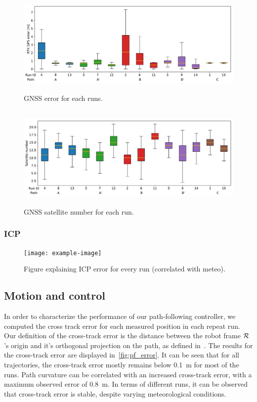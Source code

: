 \begin{figure} [htpb]
	\centering
	\includegraphics[height=2.0in]{./figs/GPS/RTK_error.pdf}
	\caption{GNSS error for each runs.}
	\label{fig:gnss_run_error}
\end{figure}

\begin{figure} [htpb]
	\centering
	\includegraphics[height=2.0in]{./figs/GPS/Satellite_number.pdf}
	\caption{GNSS satellite number for each run.}
	\label{fig:gnss_satellite_number}
\end{figure}

\subsubsection{ICP}
\label{sec:ICP}

\lightlipsum[1]

\begin{figure} [htpb]
	\centering
	\texttt{[image: example-image]}
	\caption{Figure explaining ICP error for every run (correlated with meteo).}
	\label{fig:icp_error}
\end{figure}



\subsection{Motion and control}
\label{sec:res_motion}

In order to characterize the performance of our path-following controller, we computed the cross track error for each measured position in each repeat run.
Our definition of the cross-track error is the distance between the robot frame $\mathcal{R}$'s origin and it's orthogonal projection on the path, as defined in~\citep{Mondoloni2005}.
The results for the cross-track error are displayed in~\autoref{fig:pf_error}.
It can be seen that for all trajectories, the cross-track error mostly remains below \SI{0.1}{m} for most of the runs.
Path curvature can be correlated with an increased cross-track error, with a maximum observed error of \SI{0.8}{m}.
In terms of different runs, it can be observed that cross-track error is stable, despite varying meteorological conditions. 


